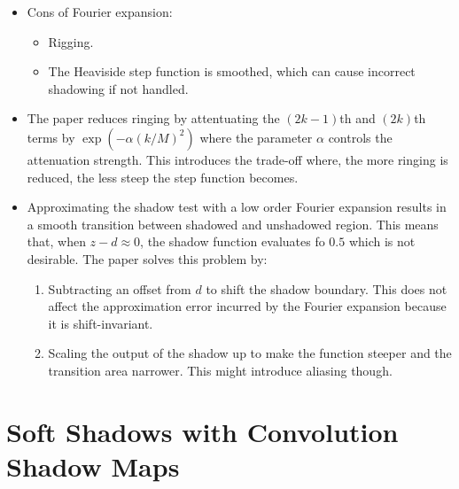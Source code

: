 \documentclass[10pt]{article}
\begin{document}
\begin{itemize}
  	\item Cons of Fourier expansion:
  	\begin{itemize}
  		\item Rigging.
  		\item The Heaviside step function is smoothed, which can cause incorrect shadowing if not handled.
  	\end{itemize}

  	\item The paper reduces ringing by attentuating the $(2k-1)$th and $(2k)$th terms by $\exp(-\alpha(k/M)^2)$ where the parameter $\alpha$ controls the attenuation strength.  This introduces the trade-off where, the more ringing is reduced, the less steep the step function becomes.

  	\item Approximating the shadow test with a low order Fourier expansion results in a smooth transition between shadowed and unshadowed region.  This means that, when $z-d \approx 0$, the shadow function evaluates fo $0.5$ which is not desirable.  The paper solves this problem by:
  	\begin{enumerate}  	 
  		\item Subtracting an offset from $d$ to shift the shadow boundary.  This does not affect the approximation error incurred by the Fourier expansion because it is shift-invariant.
  		\item Scaling the output of the shadow up to make the function steeper and the transition area narrower.  This might introduce aliasing though.
  	\end{enumerate}  	 
  \end{itemize}

  \section{Soft Shadows with Convolution Shadow Maps}
\end{document}
